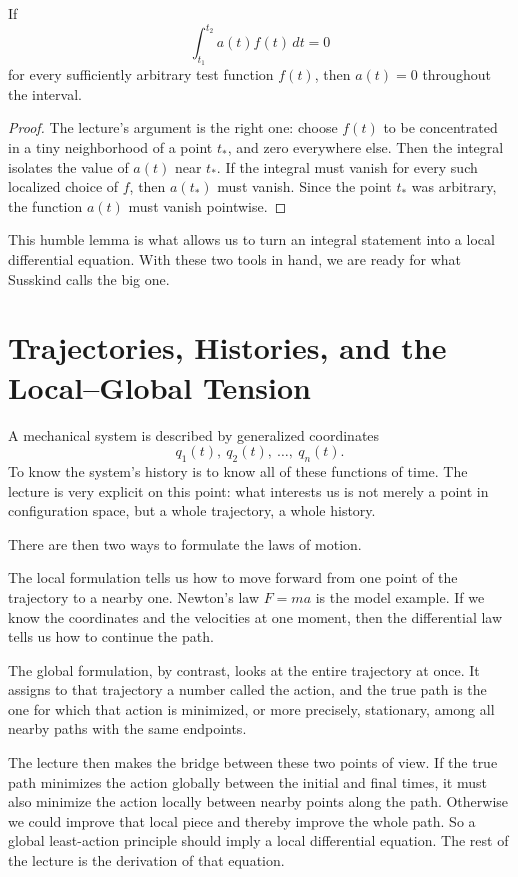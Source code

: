 \begin{proposition}
If
\begin{equation}
\int_{t_1}^{t_2} a(t)f(t)\,dt = 0
\end{equation}
for every sufficiently arbitrary test function \(f(t)\), then \(a(t)=0\) throughout the interval.
\end{proposition}

\begin{proof}
The lecture's argument is the right one: choose \(f(t)\) to be concentrated in a tiny neighborhood of a point \(t_*\), and zero everywhere else. Then the integral isolates the value of \(a(t)\) near \(t_*\). If the integral must vanish for every such localized choice of \(f\), then \(a(t_*)\) must vanish. Since the point \(t_*\) was arbitrary, the function \(a(t)\) must vanish pointwise.
\end{proof}

This humble lemma is what allows us to turn an integral statement into a local differential equation. With these two tools in hand, we are ready for what Susskind calls the big one.

\section{Trajectories, Histories, and the Local--Global Tension}

A mechanical system is described by generalized coordinates
\[
q_1(t),\ q_2(t),\ \dots,\ q_n(t).
\]
To know the system's history is to know all of these functions of time. The lecture is very explicit on this point: what interests us is not merely a point in configuration space, but a whole trajectory, a whole history.

There are then two ways to formulate the laws of motion.

The local formulation tells us how to move forward from one point of the trajectory to a nearby one. Newton's law \(F=ma\) is the model example. If we know the coordinates and the velocities at one moment, then the differential law tells us how to continue the path.

The global formulation, by contrast, looks at the entire trajectory at once. It assigns to that trajectory a number called the action, and the true path is the one for which that action is minimized, or more precisely, stationary, among all nearby paths with the same endpoints.

The lecture then makes the bridge between these two points of view. If the true path minimizes the action globally between the initial and final times, it must also minimize the action locally between nearby points along the path. Otherwise we could improve that local piece and thereby improve the whole path. So a global least-action principle should imply a local differential equation. The rest of the lecture is the derivation of that equation.

